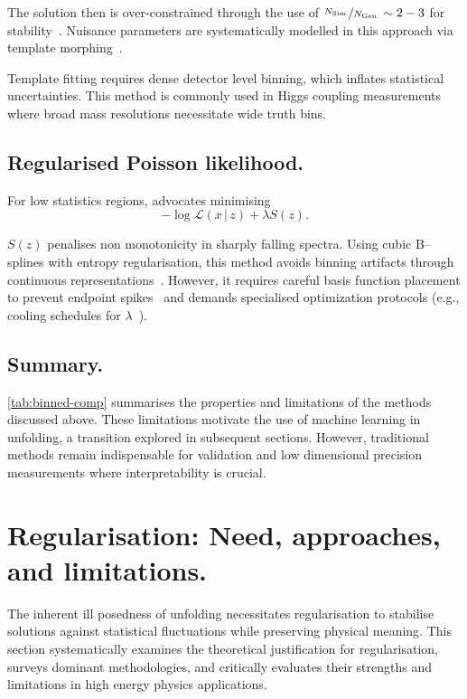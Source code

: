 The solution then is over-constrained through the use of \(\nicefrac{N_{\text{Sim.}}}{N_{\text{Gen.}}} \sim 2-3\) for stability~\cite{britzger_linear_2022}.
%
Nuisance parameters are systematically modelled in this approach via template morphing~\cite{baak_interpolation_2015}.

Template fitting requires dense detector level binning, which inflates statistical uncertainties.
%
This method is commonly used in Higgs coupling measurements where broad mass resolutions necessitate wide truth bins.

\subsection{Regularised Poisson likelihood.}  
For low statistics regions, \cite{gaponenko_practical_2020} advocates minimising
\begin{equation}
     -\log \mathcal{L}(x\,|\,z) + \lambda S(z).
\end{equation}  

\(S(z)\) penalises non monotonicity in sharply falling spectra.
%
Using cubic B--splines with entropy regularisation, this method avoids binning artifacts through continuous representations~\cite{gaponenko_practical_2020}.
%
However, it requires careful basis function placement to prevent endpoint spikes~\cite{fan_analysis_2022} and demands specialised optimization protocols (e.g., cooling schedules for \(\lambda\)~\cite{jia_sparse_2019}).

    \subsection{Summary.}  
        
        \cref{tab:binned-comp} summarises the properties and limitations of the methods discussed above.
        These limitations motivate the use of machine learning in unfolding, a transition explored in subsequent sections.
        However, traditional methods remain indispensable for validation and low dimensional precision measurements where interpretability is crucial.
        
\section{Regularisation: Need, approaches, and limitations.}
    The inherent ill posedness of unfolding necessitates regularisation to stabilise solutions against statistical fluctuations while preserving physical meaning.
    This section systematically examines the theoretical justification for regularisation, surveys dominant methodologies, and critically evaluates their strengths and limitations in high energy physics applications.
        
